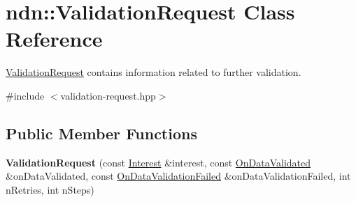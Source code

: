 \hypertarget{classndn_1_1ValidationRequest}{}\section{ndn\+:\+:Validation\+Request Class Reference}
\label{classndn_1_1ValidationRequest}


\hyperlink{classndn_1_1ValidationRequest}{Validation\+Request} contains information related to further validation.  




{\ttfamily \#include $<$validation-\/request.\+hpp$>$}

\subsection*{Public Member Functions}
\begin{DoxyCompactItemize}
\item 
{\bfseries Validation\+Request} (const \hyperlink{classndn_1_1Interest}{Interest} \&interest, const \hyperlink{namespacendn_aeaa15e849fd25636f59ca61acb64e532}{On\+Data\+Validated} \&on\+Data\+Validated, const \hyperlink{namespacendn_ae3c60219d74ba747e368708d93782760}{On\+Data\+Validation\+Failed} \&on\+Data\+Validation\+Failed, int n\+Retries, int n\+Steps)\hypertarget{classndn_1_1ValidationRequest_a403c341aba06c4c61823a3e5036ab731}{}\label{classndn_1_1ValidationRequest_a403c341aba06c4c61823a3e5036ab731}

\end{DoxyCompactItemize}
